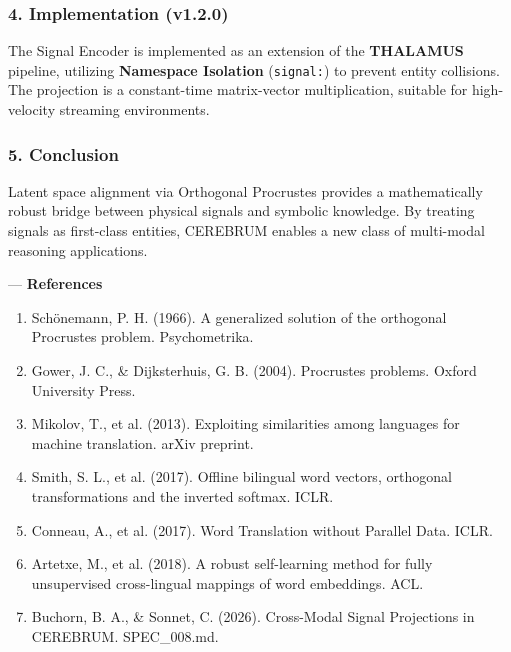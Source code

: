 \documentclass[10pt,journal,compsoc]{IEEEtran}
\begin{document}
\subsubsection{4. Implem\-entation (v1.2.0)}
The Signal Encoder is implemented as an extension of the \textbf{THALAMUS} pipeline, utilizing \textbf{Namespace Isolation} (\texttt{signal:}) to prevent entity collisions. The projection is a constant-time matrix-vector multi\-plication, suitable for high-velocity streaming envir\-onments.

\subsubsection{5. Conclusion}
Latent space alignment via Orthogonal Procrustes provides a mathe\-matically robust bridge between physical signals and symbolic knowledge. By treating signals as first-class entities, CEREBRUM enables a new class of multi-modal reasoning appli\-cations.

---
\textbf{References}
\begin{enumerate}
\item Schönemann, P. H. (1966). A generalized solution of the orthogonal Procrustes problem. Psycho\-metrika.
\item Gower, J. C., \& Dijkst\-erhuis, G. B. (2004). Procrustes problems. Oxford University Press.
\item Mikolov, T., et al. (2013). Exploiting simil\-arities among languages for machine translation. arXiv preprint.
\item Smith, S. L., et al. (2017). Offline bilingual word vectors, orthogonal trans\-formations and the inverted softmax. ICLR.
\item Conneau, A., et al. (2017). Word Translation without Parallel Data. ICLR.
\item Artetxe, M., et al. (2018). A robust self-learning method for fully unsup\-ervised cross-lingual mappings of word embeddings. ACL.
\item Buchorn, B. A., \& Sonnet, C. (2026). Cross-Modal Signal Projections in CEREBRUM. SPEC\_008.md.

\end{enumerate}



\end{document}
